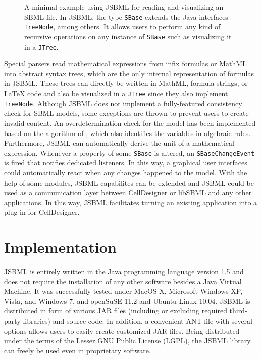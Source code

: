 \documentclass{bioinfo}
\begin{document}
\begin{methods}
\begin{figure}
{  	} \caption[A minimal example using JSBML for reading and visualizing an SBML file using JSBML]{
A minimal example using JSBML for reading and visualizing an SBML file. In JSBML, the type \texttt{SBase} extends 
the Java interfaces \texttt{TreeNode}, among others. It allows users
to perform any kind of recursive operations on any instance of \texttt{SBase} such as visualizing it in a \texttt{JTree}.
}
\label{fig:JSBML}
\end{figure}
Special parsers read mathematical expressions from infix formulas or MathML 
into abstract syntax trees, which are the only internal representation
of formulas in JSBML.
These trees can directly be written in MathML, formula strings, or \LaTeX{} code and 
also be visualized in a \texttt{JTree} since they also implement \texttt{TreeNode}. 
Although JSBML does not implement a fully-featured consistency check for SBML
models, some exceptions are thrown to prevent users to create invalid content.
An overdetermination check for the model has been implemented based on the 
algorithm of \citet{Hopcroft1973}, which also identifies the variables 
in algebraic rules. Furthermore, JSBML can automatically derive the unit of a mathematical expression.
Whenever a property of some \texttt{SBase} is altered, an \texttt{SBaseChangeEvent} is fired
that notifies dedicated listeners. In this way, a graphical user interfaces
could automatically react when any changes happened to the model. With the
help of some modules, JSBML capabilites can be extended and JSBML could be used
as a communication layer between CellDesigner \citep{Funahashi2003} or 
libSBML and any other applications. In this way, JSBML 
facilitates turning an existing application into a plug-in for CellDesigner.
\end{methods}

\section{Implementation}

JSBML is entirely written in the Java\texttrademark{} programming language version 1.5 and does 
not require the installation of any other software besides a Java Virtual Machine. It was successfully
tested under MacOS X, Microsoft Windows XP, Vista, and Windows 7, and openSuSE 11.2 and 
Ubuntu Linux 10.04. JSBML is distributed in form of various JAR files (including or excluding required
third-party libraries) and source code. In addition, a convenient ANT file with several options allows 
users to easily create customized JAR files. Being distributed under the terms of the Lesser GNU
Public License (LGPL), the JSBML library can freely be used even in proprietary software.
\end{document}
